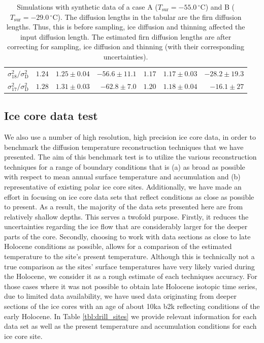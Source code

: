 \documentclass[11pt, draftcls, onecolumn]{IEEEtran} %
\numberwithin{equation}{section}
\numberwithin{table}{section}
\numberwithin{figure}{section}
\begin{document}
\begin{table}[]
\begin{tabular}{r r r r r r r }
		
		$\sigma^2_{18}/\sigma^2_\mathrm{D} $&$	1.24$& $1.25 \pm 0.04 $ 	& $-56.6 \pm 11.1$	&$1.17$	& 	$1.17 \pm 0.03$ 	& $-28.2 \pm 19.3$\\
		
		
		$\sigma^2_{17}/\sigma^2_\mathrm{D} $&$	1.28$& $ 1.31 \pm 0.03 $ 	& $  -62.8 \pm 7.0$	&$1.20$	& 	$1.18 \pm 0.04$ 	& $ -16.1 \pm 27 $\\
		\bottomrule		
	\end{tabular}
	\caption{Simulations with synthetic data of a case A ($T_{\mathrm{sur}} = -55.0 \,^{\circ} \mathrm{C}$) 
		and B ($T_{\mathrm{sur}} = -29.0 \,^{\circ} \mathrm{C}$). 
		The diffusion lengths in the tabular are the firn diffusion lengths.
		Thus, this is before sampling, ice diffusion and thinning affected the input diffusion length.
		The estimated firn diffusion lengths are after correcting for sampling, ice diffusion and thinning (with their corresponding uncertainties).  }
	\label{tbl:synthetic_diff_lens}
\end{table}





\subsection{Ice core data test} \label{sec:icecore_results}
We also use a number of high resolution, high precision ice core data, in order to benchmark the 
diffusion temperature reconstruction techniques that we have  presented.
The aim of this benchmark test is to utilize the various reconstruction techniques for a range of
boundary conditions that is (a) as broad as possible with respect to mean annual surface temperature 
and accumulation and (b) representative of existing polar ice core sites.
Additionally, we have made an effort in focusing on ice core  data sets that reflect conditions as close as possible to 
present. As a result, the majority of the data sets presented here are from relatively shallow depths. 
This serves a twofold purpose. 
Firstly, it reduces the uncertainties regarding the ice flow that are considerably
larger for the deeper parts of the core. 
Secondly, choosing to work with data sections as close to late Holocene
conditions as possible, allows for a comparison of the estimated temperature to the site's present temperature.
Although this is technically not a true comparison as the sites' surface temperatures have very likely
varied during the Holocene, we consider  it as a rough estimate of each techniques accuracy.
For those cases where it was not possible to obtain late Holocene isotopic time series, due to limited data availability,
we have used data originating from deeper sections of the ice cores with an age  
of about 10ka b2k reflecting conditions of  the early Holocene. In Table \ref{tbl:drill_sites} we provide relevant 
information for each data set as well as the present 
temperature and accumulation conditions for each ice core site.
\end{document}
